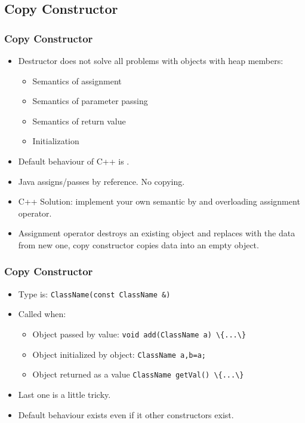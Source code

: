 \subsection{Copy Constructor}
\begin{frame}
\frametitle{Copy Constructor}
\begin{itemize}[<+->]
\item Destructor does not solve all problems with objects with heap members:
\begin{itemize}
\item Semantics of assignment
\item Semantics of parameter passing
\item Semantics of return value
\item Initialization
\end{itemize}
\item Default behaviour of C++ is .
\item Java assigns/passes by reference. No copying.
\item C++ Solution: implement your own semantic by  and
	overloading assignment operator.
\item Assignment operator destroys an existing object and replaces with the data from new one,
copy constructor copies data into an empty object.
\end{itemize}
\end{frame}

\begin{frame}
\frametitle{Copy Constructor}
\begin{itemize}
\item Type is: \lstinline!ClassName(const ClassName &)! 
\item Called when:
\begin{itemize}
\item Object passed by value: \lstinline!void add(ClassName a) \{...\}!
\item Object initialized by object: \lstinline!ClassName a,b=a;!
\item Object returned as a value \lstinline!ClassName getVal() \{...\}!
\end{itemize}
\item Last one is a little tricky.
\item Default behaviour exists even if it other constructors exist.
\end{itemize}
\end{frame}

